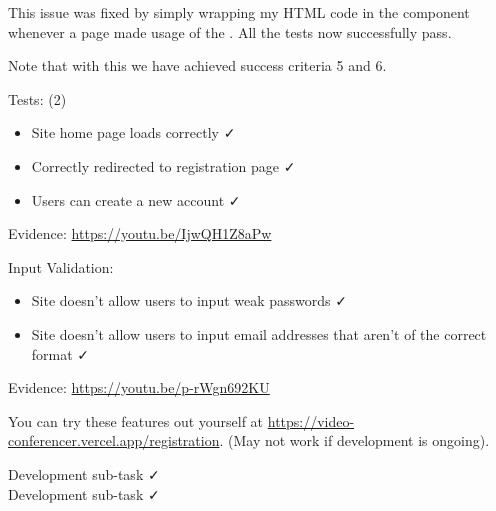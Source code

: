 This issue was fixed by simply wrapping my HTML code in the
 component whenever a page made usage of the
. All the tests now successfully pass. \\ \vspace{0.2cm}

Note that with this we have achieved success criteria 5 and 6. \\ \vspace{0.2cm}

{\color{gray} \hrulefill}
\vspace{0.2cm}

{\sffamily Tests: (2)}
\begin{itemize}
  \item Site home page loads correctly \faCheck \\
  \item Correctly redirected to registration page \faCheck \\
  \item Users can create a new account \faCheck \\
\end{itemize}

{\sffamily Evidence: \url{https://youtu.be/IjwQH1Z8aPw}} \\ \vspace{0.2cm}

{\sffamily Input Validation:}
\begin{itemize}
  \item Site doesn't allow users to input weak passwords \faCheck \\
  \item Site doesn't allow users to input email addresses that aren't of the correct format \faCheck \\
\end{itemize}

{\sffamily Evidence: } \url{https://youtu.be/p-rWgn692KU}

{\color{gray} \hrulefill}
\vspace{0.2cm}

You can try these features out yourself at \url{https://video-conferencer.vercel.app/registration}.
(May not work if development is ongoing).\\ \vspace{0.2cm}

{\sffamily Development sub-task  \faCheck \\ \vspace{0.2cm}
Development sub-task  \faCheck } \\ \vspace{0.2cm}

